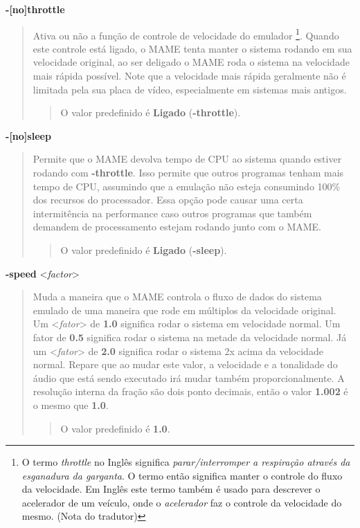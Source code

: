\documentclass[letterpaper,10pt,brazil]{sphinxmanual}
\begin{document}
\label{commandline/commandline-all:mame-commandline-nothrottle}
\textbf{-{[}no{]}throttle}
\begin{quote}

Ativa ou não a função de controle de velocidade do emulador \footnote[5]{\sphinxAtStartFootnote%
O termo \emph{throttle} no Inglês significa \emph{parar/interromper a
respiração através da esganadura da garganta}. O termo então
significa manter o controle do fluxo da velocidade. Em Inglês
este termo também é usado para descrever o acelerador de um
veículo, onde o \emph{acelerador} faz o controle da velocidade do
mesmo. (Nota do tradutor)
}.
Quando este controle está ligado, o MAME tenta manter o sistema
rodando em sua velocidade original, ao ser deligado o MAME roda o
sistema na velocidade mais rápida possível.
Note que a velocidade mais rápida geralmente não é limitada pela sua
placa de vídeo, especialmente em sistemas mais antigos.
\begin{quote}

O valor predefinido é \textbf{Ligado} (\textbf{-throttle}).
\end{quote}
\end{quote}
\label{commandline/commandline-all:mame-commandline-nosleep}
\textbf{-{[}no{]}sleep}
\begin{quote}

Permite que o MAME devolva tempo de CPU ao sistema quando
estiver rodando com \textbf{-throttle}. Isso permite que outros programas
tenham mais tempo de CPU, assumindo que a emulação não esteja
consumindo 100\% dos recursos do processador. Essa opção pode causar
uma certa intermitência na performance caso outros programas que
também demandem de processamento estejam rodando junto com o MAME.
\begin{quote}

O valor predefinido é \textbf{Ligado} (\textbf{-sleep}).
\end{quote}
\end{quote}
\label{commandline/commandline-all:mame-commandline-speed}
\textbf{-speed} \textless{}\emph{factor}\textgreater{}
\begin{quote}

Muda a maneira que o MAME controla o fluxo de dados do sistema
emulado de uma maneira que rode em múltiplos da velocidade original.
Um \textless{}\emph{fator}\textgreater{} de \textbf{1.0} significa rodar o sistema em velocidade
normal. Um fator de \textbf{0.5} significa rodar o sistema na metade da
velocidade normal.
Já um \textless{}\emph{fator}\textgreater{} de \textbf{2.0} significa rodar o sistema 2x acima da
velocidade normal. Repare que ao mudar este valor, a velocidade e a
tonalidade do áudio que está sendo executado irá mudar também
proporcionalmente. A resolução interna da fração são dois ponto
decimais, então o valor \textbf{1.002} é o mesmo que \textbf{1.0}.
\begin{quote}

O valor predefinido é \textbf{1.0}.
\end{quote}
\end{quote}
\end{document}
